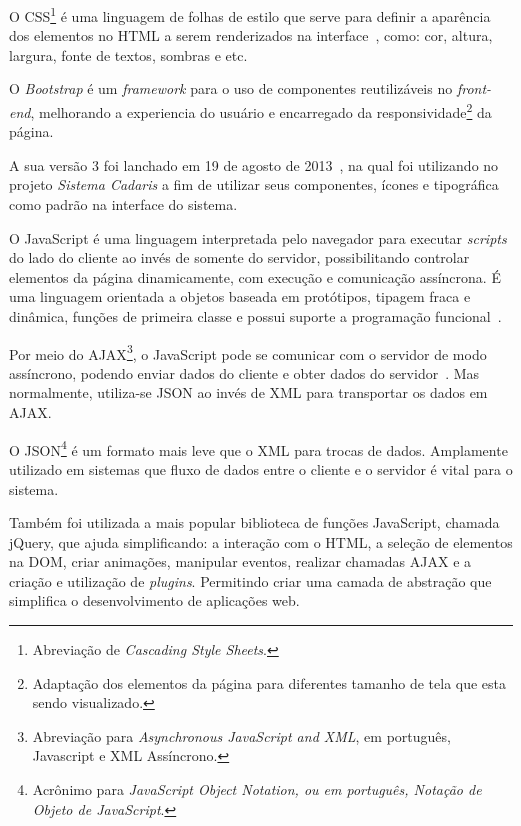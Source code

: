 \documentclass[
  12pt,            %
  openany,
  oneside,
  a4paper,         %
  english,      %
  brazil
]{article}
\numberwithin{figure}{section}
\numberwithin{table}{section}
\newcounter{subsubsubsection}[subsubsection]
\begin{document}


O CSS\footnote{Abreviação de \textit{Cascading Style Sheets}.} é uma linguagem de folhas de estilo que serve para definir a aparência dos elementos no HTML a serem renderizados na interface~\cite{Novatec_css_html}, como: cor, altura, largura, fonte de textos, sombras e etc.



O \textit{Bootstrap} é um \textit{framework} para o uso de componentes reutilizáveis no \textit{front-end}, melhorando a experiencia do usuário e encarregado da responsividade\footnote{Adaptação dos elementos da página para diferentes tamanho de tela que esta sendo visualizado.} da página.

A sua versão 3 foi lanchado em 19 de agosto de 2013~\cite{blog_bootstrap}, na qual foi utilizando no projeto \textit{Sistema Cadaris} a fim de utilizar seus componentes, ícones e tipográfica como padrão na interface do sistema.


O JavaScript é uma linguagem interpretada pelo navegador para executar \textit{scripts} do lado do cliente ao invés de somente do servidor, possibilitando controlar elementos da página dinamicamente, com execução e comunicação assíncrona. É uma linguagem orientada a objetos baseada em protótipos, tipagem fraca e dinâmica, funções de primeira classe e possui suporte a programação funcional~\cite{PHP_Novatec_dev}.

Por meio do AJAX\footnote{Abreviação para \textit{Asynchronous JavaScript and XML}, em português, Javascript e XML Assíncrono.}, o JavaScript pode se comunicar com o servidor de modo assíncrono, podendo enviar dados do cliente e obter dados do servidor~\cite{PHP_Novatec_ajax}. Mas normalmente, utiliza-se JSON ao invés de XML para transportar os dados em AJAX.

O JSON\footnote{Acrônimo para \textit{JavaScript Object Notation, ou em português, Notação de Objeto de JavaScript}.} é um formato mais leve que o XML para trocas de dados. Amplamente utilizado em sistemas que fluxo de dados entre o cliente e o servidor é vital para o sistema.

Também foi utilizada a mais popular biblioteca de funções JavaScript, chamada jQuery, que ajuda simplificando: a interação com o HTML, a seleção de elementos na DOM, criar animações, manipular eventos, realizar chamadas AJAX e a criação e utilização de \textit{plugins}. Permitindo criar uma camada de abstração que simplifica o desenvolvimento de aplicações web.
\end{document}
